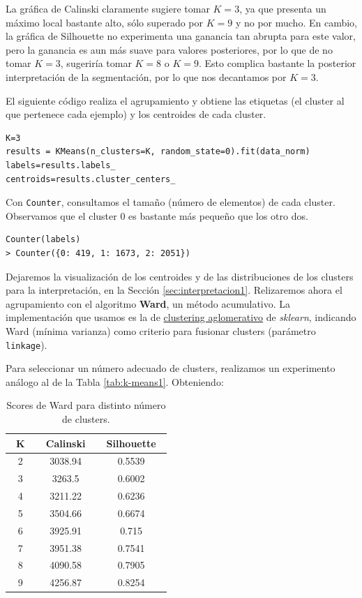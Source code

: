 \documentclass[oneside]{book}
\begin{document}
La gráfica de Calinski claramente sugiere tomar $K=3$, ya que presenta
un máximo local bastante alto, sólo superado por $K=9$ y no por
mucho. En cambio, la gráfica de Silhouette no experimenta una ganancia
tan abrupta para este valor, pero la ganancia es aun más suave para
valores posteriores, por lo que de no tomar $K=3$, sugeriría tomar
$K=8$ o $K=9$. Esto complica bastante la posterior interpretación de
la segmentación, por lo que nos decantamos por $K=3$.

El siguiente código realiza el agrupamiento y obtiene las etiquetas
(el cluster al que pertenece cada ejemplo) y los centroides de cada
cluster.

\begin{verbatim}
K=3
results = KMeans(n_clusters=K, random_state=0).fit(data_norm)
labels=results.labels_
centroids=results.cluster_centers_
\end{verbatim}

Con \texttt{Counter}, consultamos el tamaño (número de elementos) de
cada cluster. Observamos que el cluster 0 es bastante más pequeño que
los otro dos.
\begin{verbatim}
Counter(labels)
> Counter({0: 419, 1: 1673, 2: 2051})
\end{verbatim}

Dejaremos la visualización de los centroides y de las distribuciones
de los clusters para la interpretación, en la Sección
\ref{sec:interpretacion1}. Relizaremos ahora el agrupamiento con el
algoritmo \textbf{Ward}, un método acumulativo. La implementación que
usamos es la de
\href{https://scikit-learn.org/stable/modules/generated/sklearn.cluster.AgglomerativeClustering.html}{clustering
  aglomerativo} de \textit{sklearn}, indicando Ward (mínima varianza)
como criterio para fusionar clusters (parámetro \texttt{linkage}).

Para seleccionar un número adecuado de clusters, realizamos un
experimento análogo al de la Tabla \ref{tab:k-means1}. Obteniendo:

\begin{table}[H]
  \centering
\begin{tabular}{|c|cc|}
  \hline
  ~\hspace{2mm}K\hspace{2mm}~ & ~\hspace{2mm}Calinski\hspace{2mm}~ & ~\hspace{2mm}Silhouette\hspace{2mm}~ \\ \hline
2 & 3038.94 & 0.5539 \\ \hline
3 & 3263.5 & 0.6002 \\ \hline
4 & 3211.22 & 0.6236 \\ \hline
5 & 3504.66 & 0.6674 \\ \hline
6 & 3925.91 & 0.715 \\ \hline
7 & 3951.38 & 0.7541 \\ \hline
8 & 4090.58 & 0.7905 \\ \hline
9 & 4256.87 & 0.8254 \\ \hline\end{tabular}
\caption{Scores de Ward para distinto número de clusters.}
\label{tab:ward1}
\end{table}
\end{document}
